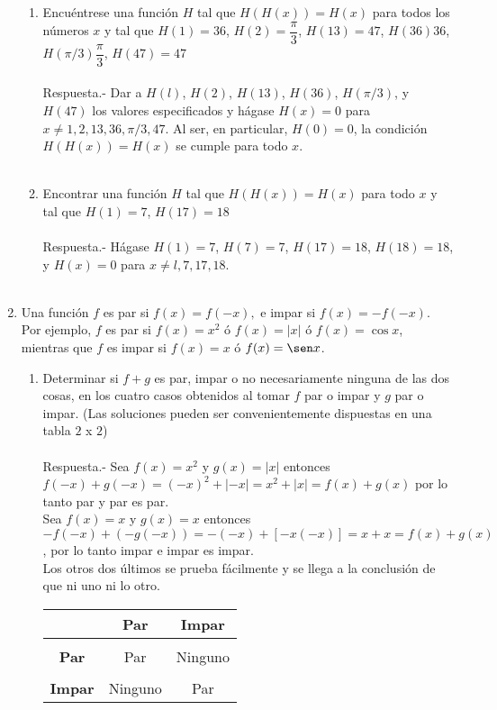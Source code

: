 \begin{enumerate}[\bfseries 1.]
\begin{enumerate}[\bfseries (a)]
	    \item Encuéntrese una función $H$ tal que $H(H(x))=H(x)$ para todos los números $x$ y tal que $H(1)=36$, $H(2)=\dfrac{\pi}{3}$, $H(13)=47$, $H(36)36$, $H(\pi / 3)\dfrac{\pi}{3}$, $H(47)=47$\\\\
	    Respuesta.-\; Dar a $H(l)$, $H(2)$, $H(13)$, $H(36)$, $H(\pi /3)$, y $H(47)$ los valores especificados y hágase $H(x) = 0$ para $x \neq 1, 2, 13, 36, \pi /3, 47.$ Al ser, en particular, $H(0) = 0$, la condición $H(H(x)) = H(x)$ se cumple para todo $x$.\\\\

	    \item Encontrar una función $H$ tal que $H(H(x))=H(x)$ para todo $x$ y tal que $H(1)=7$, $H(17)=18$\\\\
	    Respuesta.-\; Hágase $H(1) = 7$, $H(7) = 7$, $H(17) = 18$, $H(18) = 18$, y $H(x) = 0$ para $x \neq l , 7, 17, 18$.\\\\

	\end{enumerate}

	\item Una función $f$ es par si $f(x)=f(-x),$ e impar si $f(x)=-f(-x)$. Por ejemplo, $f$ es par si $f(x)=x^2$ ó $f(x)=|x|$ ó $f(x)=\cos x$, mientras que $f$ es impar si $f(x)=x$ ó $f(x)=\sen x$.

	\begin{enumerate}[\bfseries (a)]

	    \item Determinar si $f+g$ es par, impar o no necesariamente ninguna de las dos cosas, en los cuatro casos obtenidos al tomar $f$ par o impar y $g$ par o impar. (Las soluciones pueden ser convenientemente dispuestas en una tabla $2$ x $2$)\\\\
	    Respuesta.-\; Sea $f(x)=x^2$ y $g(x)=|x|$ entonces $f(-x)+g(-x)=(-x)^2 + |-x| = x^2 + |x| = f(x) + g(x)$ por lo tanto par y par es par.\\
	    Sea $f(x) = x$ y $g(x)=x$ entonces $-f(-x) + (-g(-x)) = -(-x) + [-x(-x)] = x + x = f(x) + g(x)$, por lo tanto impar e impar es impar.\\
	    Los otros dos últimos se prueba fácilmente y se llega a la conclusión de que ni uno ni lo otro.
	    \begin{center}
		\begin{tabular}{c|cc}
		    &\textbf{Par}&\textbf{Impar}\\
		    \hline\\
		    \textbf{Par}&Par&Ninguno\\\\
		    \textbf{Impar}&Ninguno&Par\\
		\end{tabular}
	    \end{center}
	    \vspace{1cm}


\end{enumerate}
\end{enumerate}
